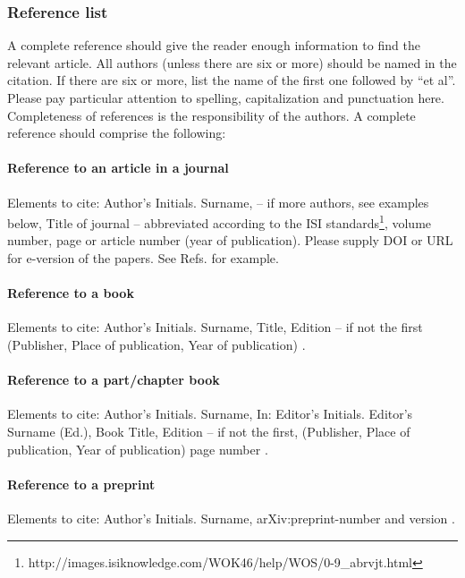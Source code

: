 \documentclass[USenglish,oneside,twocolumn]{article}
\begin{document}
\subsubsection{Reference list}

A complete reference should give the reader enough information to find the relevant article. All authors (unless there are six or more) should be named in the citation. If there are six or more, list the name of the first one followed by ``et al''. Please pay particular attention to spelling, capitalization and punctuation here. Completeness of references is the responsibility of the authors. A complete reference should comprise the following:

\paragraph{Reference to an article in a journal}
Elements to cite:
Author's Initials. Surname, -- if more authors, see examples below,
Title of journal -- abbreviated according to the ISI standards\footnote{ http://images.isiknowledge.com/WOK46/help/WOS/0-9\_abrvjt.html},
volume number, page or article number (year of publication).
Please supply DOI or URL for e-version of the papers.
See Refs. \cite{journal-1, journal-2, journal-3, journal-4, journal-5, journal-6, journal-7, journal-8} for example.

\paragraph{Reference to a book}
Elements to cite:
Author's Initials. Surname,
Title,
Edition -- if not the first
(Publisher, Place of publication, Year of publication)
\cite{book}.


\paragraph{Reference to a part/chapter book}
Elements to cite:
Author's Initials. Surname,
In: Editor's Initials. Editor's Surname (Ed.),
Book Title,
Edition -- if not the first,
(Publisher, Place of publication, Year of publication)
page number \cite{chapter}.


\paragraph{Reference to a preprint}
Elements to cite:
Author's Initials. Surname,
arXiv:preprint-number and version \cite{arxiv-1,arxiv-2}.
\end{document}
